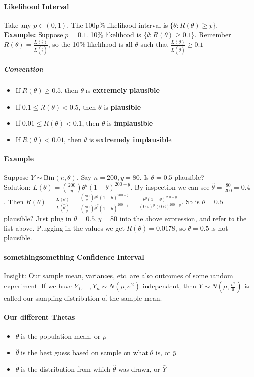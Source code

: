 \documentclass[10pt,letter]{article}
\theoremstyle{plain}
\theoremstyle{definition}
\begin{document}
\paragraph{Likelihood Interval}
Take any $p\in(0,1)$. The 100p\% likelihood interval is $\{\theta:R(\theta)\geq p\}$. \\ 
\textbf{Example:} Suppose $p=0.1$. 10\% likelihood is $\{\theta:R(\theta)\geq0.1\}$. Remember $R(\theta)=\frac{L(\theta)}{L(\hat{\theta})}$, so the 10\% likelihood is all $\theta$ such that $\frac{L(\theta)}{L(\hat{\theta})}\geq 0.1$ 
\subparagraph{Convention} 
\begin{itemize}
    \item If $R(\theta)\geq0.5$, then $\theta$ is \textbf{extremely plausible} 
    \item If $0.1\leq R(\theta)<0.5$, then $\theta$ is \textbf{plausible}
    \item If $0.01\leq R(\theta)<0.1$, then $\theta$ is \textbf{implausible}
    \item If $R(\theta)<0.01$, then $\theta$ is \textbf{extremely implausible}
\end{itemize}
\paragraph{Example}
Suppose $Y\sim\text{Bin}(n,\theta)$. Say $n=200,y=80$. Is $\theta=0.5$ plausible? \\ 
Solution: $L(\theta)={200\choose y}\theta^y(1-\theta)^{200-y}$. By inspection we can see $\hat{\theta}=\frac{80}{200}=0.4$. Then $R(\theta)=\frac{L(\theta)}{L(\hat\theta)}=\frac{{200\choose y}\theta^y(1-\theta)^{200-y}}{{200\choose y}\hat\theta^y(1-\hat\theta)^{200-y}}=\frac{\theta^y(1-\theta)^{200-y}}{(0.4)^y(0.6)^{200-y}}$. So is $\theta=0.5$ plausible? Just plug in $\theta=0.5,y=80$ into the above expression, and refer to the list above. Plugging in the values we get $R(\theta)=0.0178$, so $\theta=0.5$ is not plausible. 

\paragraph{somethingsomething Confidence Interval}
Insight: Our sample mean, variances, etc. are also outcomes of some random experiment. If we have $Y_1,\ldots,Y_n\sim N(\mu,\sigma^2)$ independent, then $\bar{Y}\sim N(\mu,\frac{\sigma^2}{n})$ is called our sampling distribution of the sample mean.  
\paragraph{Our different Thetas}
\begin{itemize}
    \item $\theta$ is the population mean, or $\mu$ 
    \item $\hat{\theta}$ is the best guess based on sample on what $\theta$ is, or $\bar{y}$ 
    \item $\tilde{\theta}$ is the distribution from which $\hat{\theta}$ was drawn, or $\bar{Y}$ \\
\end{itemize}
\end{document}
